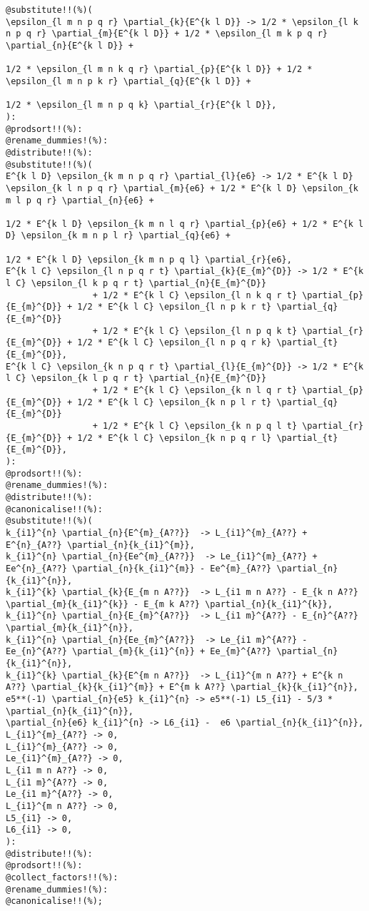 \documentclass[11pt]{article}
\begin{document}
{\color[named]{Blue}\begin{verbatim}
@substitute!!(%)(
\epsilon_{l m n p q r} \partial_{k}{E^{k l D}} -> 1/2 * \epsilon_{l k n p q r} \partial_{m}{E^{k l D}} + 1/2 * \epsilon_{l m k p q r} \partial_{n}{E^{k l D}} + 
                                                                               1/2 * \epsilon_{l m n k q r} \partial_{p}{E^{k l D}} + 1/2 * \epsilon_{l m n p k r} \partial_{q}{E^{k l D}} +
                                                                               1/2 * \epsilon_{l m n p q k} \partial_{r}{E^{k l D}},
):
@prodsort!!(%):
@rename_dummies!(%):
@distribute!!(%):
@substitute!!(%)(
E^{k l D} \epsilon_{k m n p q r} \partial_{l}{e6} -> 1/2 * E^{k l D} \epsilon_{k l n p q r} \partial_{m}{e6} + 1/2 * E^{k l D} \epsilon_{k m l p q r} \partial_{n}{e6} + 
                                                                               1/2 * E^{k l D} \epsilon_{k m n l q r} \partial_{p}{e6} + 1/2 * E^{k l D} \epsilon_{k m n p l r} \partial_{q}{e6} +
                                                                               1/2 * E^{k l D} \epsilon_{k m n p q l} \partial_{r}{e6},
E^{k l C} \epsilon_{l n p q r t} \partial_{k}{E_{m}^{D}} -> 1/2 * E^{k l C} \epsilon_{l k p q r t} \partial_{n}{E_{m}^{D}} 
                 + 1/2 * E^{k l C} \epsilon_{l n k q r t} \partial_{p}{E_{m}^{D}} + 1/2 * E^{k l C} \epsilon_{l n p k r t} \partial_{q}{E_{m}^{D}}
                 + 1/2 * E^{k l C} \epsilon_{l n p q k t} \partial_{r}{E_{m}^{D}} + 1/2 * E^{k l C} \epsilon_{l n p q r k} \partial_{t}{E_{m}^{D}},
E^{k l C} \epsilon_{k n p q r t} \partial_{l}{E_{m}^{D}} -> 1/2 * E^{k l C} \epsilon_{k l p q r t} \partial_{n}{E_{m}^{D}} 
                 + 1/2 * E^{k l C} \epsilon_{k n l q r t} \partial_{p}{E_{m}^{D}} + 1/2 * E^{k l C} \epsilon_{k n p l r t} \partial_{q}{E_{m}^{D}}
                 + 1/2 * E^{k l C} \epsilon_{k n p q l t} \partial_{r}{E_{m}^{D}} + 1/2 * E^{k l C} \epsilon_{k n p q r l} \partial_{t}{E_{m}^{D}},
):
@prodsort!!(%):
@rename_dummies!(%):
@distribute!!(%):
@canonicalise!!(%):
@substitute!!(%)(
k_{i1}^{n} \partial_{n}{E^{m}_{A??}}  -> L_{i1}^{m}_{A??} + E^{n}_{A??} \partial_{n}{k_{i1}^{m}},
k_{i1}^{n} \partial_{n}{Ee^{m}_{A??}}  -> Le_{i1}^{m}_{A??} + Ee^{n}_{A??} \partial_{n}{k_{i1}^{m}} - Ee^{m}_{A??} \partial_{n}{k_{i1}^{n}},
k_{i1}^{k} \partial_{k}{E_{m n A??}}  -> L_{i1 m n A??} - E_{k n A??} \partial_{m}{k_{i1}^{k}} - E_{m k A??} \partial_{n}{k_{i1}^{k}},
k_{i1}^{n} \partial_{n}{E_{m}^{A??}}  -> L_{i1 m}^{A??} - E_{n}^{A??} \partial_{m}{k_{i1}^{n}},
k_{i1}^{n} \partial_{n}{Ee_{m}^{A??}}  -> Le_{i1 m}^{A??} - Ee_{n}^{A??} \partial_{m}{k_{i1}^{n}} + Ee_{m}^{A??} \partial_{n}{k_{i1}^{n}},
k_{i1}^{k} \partial_{k}{E^{m n A??}}  -> L_{i1}^{m n A??} + E^{k n A??} \partial_{k}{k_{i1}^{m}} + E^{m k A??} \partial_{k}{k_{i1}^{n}},
e5**(-1) \partial_{n}{e5} k_{i1}^{n} -> e5**(-1) L5_{i1} - 5/3 * \partial_{n}{k_{i1}^{n}},
\partial_{n}{e6} k_{i1}^{n} -> L6_{i1} -  e6 \partial_{n}{k_{i1}^{n}},
L_{i1}^{m}_{A??} -> 0,
L_{i1}^{m}_{A??} -> 0,
Le_{i1}^{m}_{A??} -> 0,
L_{i1 m n A??} -> 0,
L_{i1 m}^{A??} -> 0,
Le_{i1 m}^{A??} -> 0,
L_{i1}^{m n A??} -> 0,
L5_{i1} -> 0,
L6_{i1} -> 0,
):
@distribute!!(%):
@prodsort!!(%):
@collect_factors!!(%):
@rename_dummies!(%):
@canonicalise!!(%);
\end{verbatim}}
\end{document}
